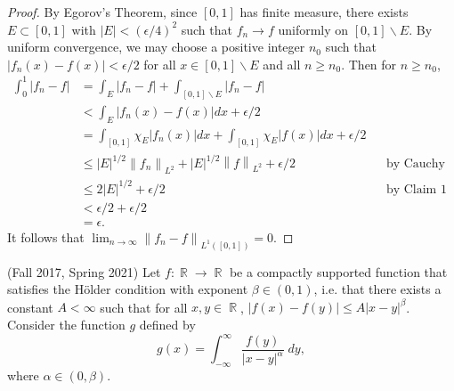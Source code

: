 \documentclass[answers]{exam}
\DeclareMathOperator{\RR}{\mathbb{R}}
\theoremstyle{problemstyle}
\newcommand{\norm}[1]{\left\lVert#1\right\rVert} %
\newcommand{\1}[1]{\textbf{1}_{\left[#1\right]}} %
\def\limn{\lim_{n\to\infty}} %
\begin{document}
\begin{questions}
\begin{solution}
\begin{proof}
  By Egorov's Theorem, since $[0,1]$ has finite measure, there exists $E\subset [0,1]$ with $|E|<(\epsilon/4)^{2}$ such that $f_{n}\to f$ uniformly on $[0,1]\backslash E$. By uniform convergence, we may choose a positive integer $n_{0}$ such that $\left| f_{n}(x)-f(x) \right|< \epsilon/2$ for all $x\in [0,1]\backslash E$ and all $n\geq n_{0}$. Then for $n\geq n_{0}$,
  \begin{align*}
    \int_{0}^{1}\left| f_{n}-f \right|
    &= \int_{E} |f_{n}-f| + \int_{[0,1]\backslash E} |f_{n}-f|\\
    &< \int_{E} |f_{n}(x)-f(x)|dx + \epsilon/2\\
    &= \int_{[0,1]} \chi_{E}|f_{n}(x)|dx  + \int_{[0,1]}\chi_{E}|f(x)|dx + \epsilon/2 \\
    &\leq |E|^{1/2}\norm{f_{n}}_{L^{2}}+ |E|^{1/2}\norm{f}_{L^{2}} + \epsilon/2 &&\text{by Cauchy Schwarz}\\
    &\leq 2 |E|^{1/2}+ \epsilon/2 &&\text{by Claim 1}\\
    &< \epsilon/2+\epsilon/2\\
    &=\epsilon.
  \end{align*}
  It follows that $\limn \norm{f_{n}-f}_{L^{1}([0,1])}=0$.
\end{proof}
\end{solution}


\question (Fall 2017, Spring 2021) Let $f: \RR \to \RR$ be a compactly supported function that satisfies the H\"{o}lder condition with exponent $\beta \in (0,1)$, i.e. that there exists a constant $A < \infty$ such that for all $x,y \in \RR$, $|f(x) - f(y)| \leq A|x-y|^\beta$. Consider the function $g$ defined by
%
\[ g(x) = \int_{-\infty}^\infty \frac{f(y)}{|x-y|^\alpha}\; dy, \]
%
where $\alpha \in (0,\beta)$.
%
\begin{parts}

\end{parts}
\end{questions}
\end{document}
